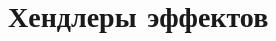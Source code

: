 \documentclass[12pt]{article}
\begin{document}
















    \section{Хендлеры эффектов} \label{sec:effect-handlers}








\end{document}
